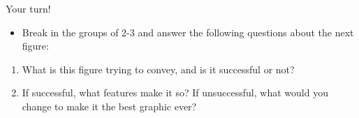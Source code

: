 \documentclass[
  ignorenonframetext,
]{beamer}
\providecommand{\tightlist}{%
  \setlength{\itemsep}{0pt}\setlength{\parskip}{0pt}}
\begin{document}
\begin{frame}{}
\label{section-28}
\end{frame}

\begin{frame}{Your turn!}
\label{your-turn}
\begin{itemize}
\tightlist
\item
  Break in the groups of 2-3 and answer the following questions about
  the next figure:
\end{itemize}

\begin{enumerate}
  \item What is this figure trying to convey, and is it successful or not?
  \item If successful, what features make it so?  If unsuccessful, what would you change to make it the best graphic ever?
\end{enumerate}
\end{frame}

\begin{frame}{}
\label{section-29}
\end{frame}
\end{document}
